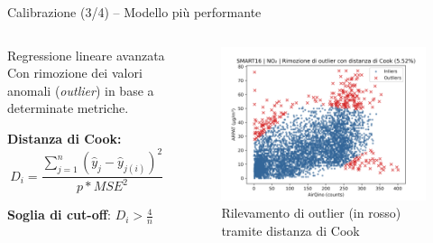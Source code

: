 \begin{frame}{Calibrazione (3/4) – Modello più performante}

\begin{columns}
\begin{column}{0.45\textwidth}

\begin{block}{Regressione lineare avanzata}
Con rimozione dei valori anomali (\textit{outlier}) in base a determinate metriche.\vspace{0.2cm}

\textbf{Distanza di Cook:}
$$D_{i}=\frac{\sum_{j=1}^{n}\left(\hat{y}_{j}-\hat{y}_{j(i)}\right)^{2}}{p  * MSE^{2}}$$

\textbf{Soglia di cut-off}:
$D_{i}>\frac{4}{n}$

\vspace{0.1cm}
\end{block}

\end{column}

\begin{column}{0.55\textwidth}

\begin{center}
\begin{figure}[H]
\centering
\captionsetup{justification=centering}
\includegraphics[width=\textwidth]{images/cook_no2.png}
\caption{Rilevamento di outlier (in rosso) tramite distanza di Cook}
\end{figure}
\end{center}

\end{column}

\end{columns}

\end{frame}

